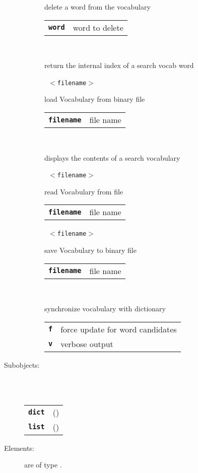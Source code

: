 \begin{description}
\begin{description}
        delete a word from the vocabulary

      \begin{tabular}{ll}
 \texttt{\textbf{word}} &  word to delete  \\
      \end{tabular}
       \texttt{} \

        return the internal index of a search vocab word

       \texttt{ $<$filename$>$} \

        load Vocabulary from binary file

      \begin{tabular}{ll}
 \texttt{\textbf{filename}} &  file name  \\
      \end{tabular}
       \texttt{} \

        displays the contents of a search vocabulary

       \texttt{ $<$filename$>$} \

        read Vocabulary from file

      \begin{tabular}{ll}
 \texttt{\textbf{filename}} &  file name  \\
      \end{tabular}
       \texttt{ $<$filename$>$} \

        save Vocabulary to binary file

      \begin{tabular}{ll}
 \texttt{\textbf{filename}} &  file name  \\
      \end{tabular}
       \texttt{  } \

        synchronize vocabulary with dictionary

      \begin{tabular}{ll}
 \texttt{\textbf{f}} &    force update for word candidates  \\
 \texttt{\textbf{v}} &    verbose output  \\
      \end{tabular}
    \end{description}

  \item[Subobjects:] \hfill \\
\ 
    \begin{tabular}{ll}
      \texttt{\textbf{dict}} & (\Jref{module}{Dictionary}) \\
      \texttt{\textbf{list}} & (\Jref{module}{List}) \\
    \end{tabular}
\vspace{3mm}

  \item[Elements:] are of type .


\end{description}

